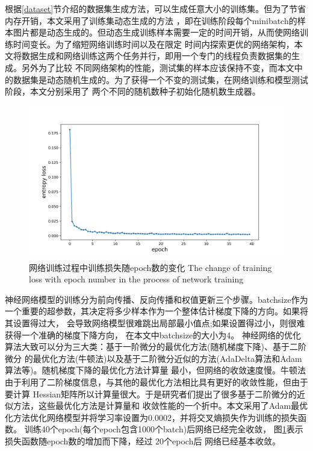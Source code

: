 	根据\ref{dataset}节介绍的数据集生成方法，可以生成任意大小的训练集。但为了节省内存开销，本文采用了训练集动态生成的方法
	，即在训练阶段每个minibatch的样本图片都是动态生成的。但动态生成训练样本需要一定的时间开销，从而使网络训练时间变长。为了缩短网络训练时间以及在限定
	时间内探索更优的网络架构，本文将数据生成和网络训练这两个任务并行，即用一个专门的线程负责数据集的生成。另外为了比较
	不同网络架构的性能，测试集的样本应该保持不变，而本文中的数据集是动态随机生成的。为了获得一个不变的测试集，在网络训练和模型测试阶段，本文分别采用了
	两个不同的随机数种子初始化随机数生成器。
		\begin{figure}[!b]
	  \centering
	  \includegraphics[width=13cm]{figure/chap4/loss.jpg}
	  \bicaption
		{网络训练过程中训练损失随epoch数的变化}
		{The change of training loss with epoch number in the process of network training}
	  \label{fig:chap4:loss}
	\end{figure}
	神经网络模型的训练分为前向传播、反向传播和权值更新三个步骤。batchsize作为一个重要的超参数，其决定将多少样本作为一个整体估计梯度下降的方向。如果将其设置得过大，
	会导致网络模型很难跳出局部最小值点;如果设置得过小，则很难获得一个准确的梯度下降方向，
	在本文中batchsize的大小为4。
	神经网络的优化算法大致可以分为三大类：基于一阶微分的最优化方法(随机梯度下降)、基于二阶微分
	的最优化方法(牛顿法)以及基于二阶微分近似的方法(AdaDelta算法\cite{zeiler2012adadelta}和Adam算法\cite{kinga2015method}等)。随机梯度下降的最优化方法计算量
	最小，但网络的收敛速度慢。牛顿法由于利用了二阶梯度信息，与其他的最优化方法相比具有更好的收敛性能，但由于要计算
	Hessian矩阵所以计算量很大。于是研究者们提出了很多基于二阶微分的近似方法，这些最优化方法是计算量和
	收敛性能的一个折中。本文采用了Adam最优化方法优化网络模型并将学习率设置为0.0002，并将交叉熵损失作为训练的损失函数。
	训练40个epoch(每个epoch包含1000个batch)后网络已经完全收敛，
	图\ref{fig:chap4:loss}表示损失函数随epoch数的增加而下降，经过 20个epoch后
	网络已经基本收敛。

